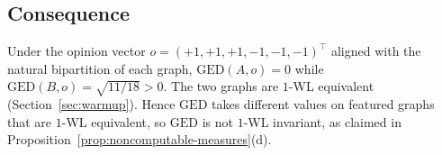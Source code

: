 \subsection*{Consequence}

Under the opinion vector $o = (+1, +1, +1, -1, -1, -1)^\top$ aligned
with the natural bipartition of each graph, $\mathrm{GED}(A, o) = 0$
while $\mathrm{GED}(B, o) = \sqrt{11/18} > 0$. The two graphs are
$1$-WL equivalent (Section~\ref{sec:warmup}). Hence $\mathrm{GED}$ takes
different values on featured graphs that are $1$-WL equivalent, so
$\mathrm{GED}$ is not $1$-WL invariant, as claimed in
Proposition~\ref{prop:noncomputable-measures}(d).
